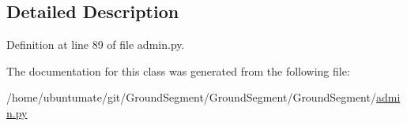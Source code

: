 \subsection{Detailed Description}


Definition at line 89 of file admin.\+py.



The documentation for this class was generated from the following file\+:\begin{DoxyCompactItemize}
\item 
/home/ubuntumate/git/\+Ground\+Segment/\+Ground\+Segment/\+Ground\+Segment/\hyperlink{admin_8py}{admin.\+py}\end{DoxyCompactItemize}
